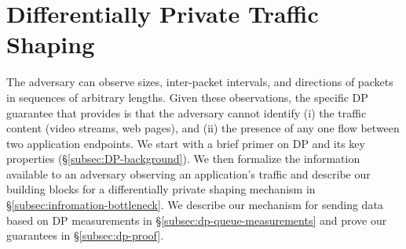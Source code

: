 \section{Differentially Private Traffic Shaping}
\label{sec:dp}

%
The adversary can observe sizes, inter-packet intervals, and directions of
packets in sequences of arbitrary lengths.
Given these observations, the specific DP guarantee that {\sys} provides is that
the adversary cannot identify (i) the traffic content (\eg video streams, web
pages), and (ii) the presence of any one flow between two application
endpoints.
%
We start with a brief primer on DP and its key properties (\S\ref{subsec:DP-background}).
We then formalize the information available to an adversary observing an
application's traffic and describe our building blocks for a differentially
private shaping mechanism in \S\ref{subsec:infromation-bottleneck}.
We describe our mechanism for sending data based on DP {measurements} in
\S\ref{subsec:dp-queue-measurements} and prove our guarantees in
\S\ref{subsec:dp-proof}.


